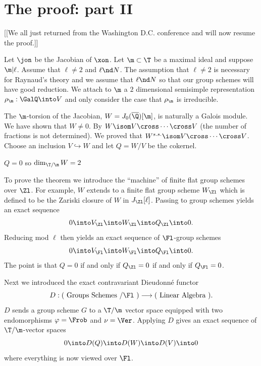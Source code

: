 \documentclass{report}
\begin{document}
\section{The proof: part II}
[[We all just returned from the Washington D.C. conference and
will now resume the proof.]]

Let $\jon$ be the Jacobian of $\xon$. Let $\m\subset\T$ be
a maximal ideal and suppose $\m|\ell$. Assume that $\ell\neq 2$
and $\ell\nd N$. The assumption that $\ell\neq 2$ is necessary
for Raynaud's theory and we assume that $\ell\nd N$ so that our
group schemes will have good reduction. We attach to $\m$ a
$2$ dimensional semisimple representation $\rho_{\m}:\GalQ\into V$
and only consider the case that $\rho_{\m}$ is irreducible.

The $\m$-torsion of the Jacobian, $W=J_0(\overline{\Q})[\m]$,
is naturally a Galois module. We have
shown that $W\neq 0$. By \cite{boston-lenstra-ribet}
$W\isom V\cross\cdots\cross V$ (the number of fractions is
not determined). We proved that $W^{s.s.}\isom V\cross\cdots\cross V$.
Choose an inclusion $V\hookrightarrow W$ and let
$Q=W/V$ be the cokernel.

\begin{theorem} $Q=0$ so $\dim_{\T/\m}W=2$ \end{theorem}

To prove the theorem we introduce the ``machine'' of finite
flat group schemes over $\Zl$. For example, $W$ extends to a
finite flat group scheme $W_{\Zl}$ which is defined to be the
Zariski closure of $W$ in $J_{\Zl}[\ell]$.
Passing to group schemes yields an exact sequence
$$0\into V_{\Zl}\into W_{\Zl}\into Q_{\Zl}\into 0.$$
Reducing mod $\ell$ then yields an exact sequence of
$\Fl$-group schemes
$$0\into V_{\Fl}\into W_{\Fl}\into Q_{\Fl}\into 0.$$
The point is that $Q=0$ if and only if $Q_{\Zl}=0$ if and only if $Q_{\Fl}=0$.

Next we introduced the exact contravariant Dieudonn\'{e} functor
$$D:(\text{ Groups Schemes }/\Fl\text{ })\longrightarrow(\text{ Linear Algebra }).$$
$D$ sends a group scheme $G$ to a $\T/\m$ vector space equipped with
two endomorphisms $\varphi=\Frob$ and $\nu=\Ver$.
Applying $D$ gives an exact sequence of $\T/\m$-vector spaces
$$0\into D(Q)\into D(W)\into D(V)\into 0$$
where everything is now viewed over $\Fl$.
\end{document}
